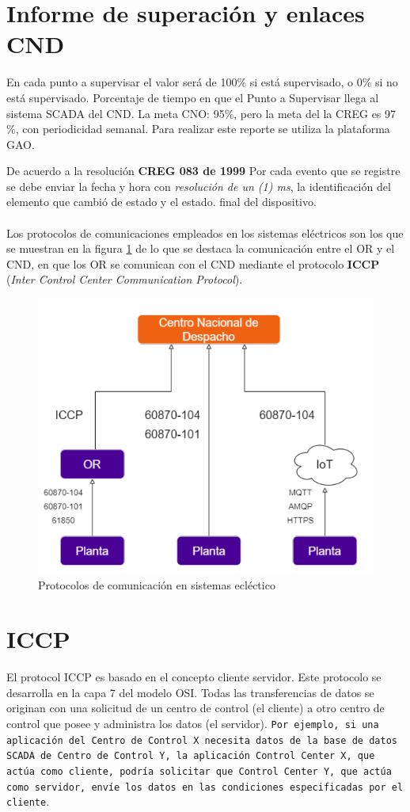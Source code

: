 \documentclass[a5paper]{book}%
\begin{document}
\section{Informe de superación y enlaces CND}

  En cada punto a supervisar el valor será de 100\% si está supervisado, o 0\% si no está supervisado. Porcentaje de tiempo en que el Punto a Supervisar llega al sistema SCADA del CND. La meta CNO: 95\%, pero la meta del la CREG es 97 \%,  con periodicidad semanal. Para realizar este reporte se utiliza la plataforma GAO.

  De acuerdo a la resolución \textbf{CREG 083 de 1999} Por cada evento que se registre se debe enviar la fecha y hora con \textit{resolución de un (1) ms}, la identificación del elemento que cambió de estado y el estado. final del dispositivo.\\\\

  
Los protocolos de comunicaciones empleados en los sistemas eléctricos son los que se muestran en la figura \ref{fig:protocoloscomunicacion} de lo que se destaca la comunicación entre el \ac{OR} y el \ac{CND}, en que los OR se comunican con el \ac{CND} mediante el protocolo \textbf{ICCP} (\textit{Inter Control Center Communication Protocol}).

\begin{figure}[H]
  \centering
  \caption{Protocolos de comunicación en sistemas ecléctico}
  \label{fig:protocoloscomunicacion}
  \includegraphics[width=0.5\linewidth]{protocolos_comunicacion}
\end{figure}

\section{ICCP}

El protocol ICCP  es basado en el concepto cliente servidor. Este protocolo se desarrolla en la capa 7 del modelo OSI. Todas las transferencias de datos se originan con una solicitud de un centro de control (el cliente) a otro centro de control que posee y administra los datos (el servidor). \texttt{Por ejemplo, si una aplicación del Centro de Control X necesita datos de la base de datos SCADA de Centro de Control Y, la aplicación Control Center X, que actúa como cliente, podría solicitar que Control Center Y, que actúa como servidor, envíe los datos en las condiciones especificadas por el cliente}.\\
\end{document}
